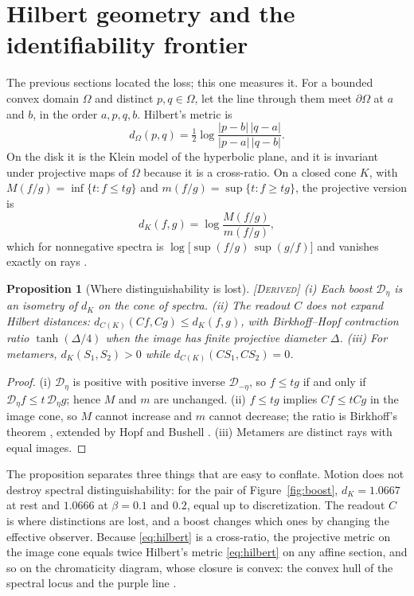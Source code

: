 \documentclass[11pt]{article}
\theoremstyle{boldplain}
\newtheorem{proposition}[lemma]{Proposition}
\theoremstyle{boldupright}
\newcommand{\derived}{[\textup{\textsc{Derived}}]}
\newcommand{\Dop}{\mathcal{D}}
\begin{document}
\section{Hilbert geometry and the identifiability frontier}\label{sec:hilbert}

The previous sections located the loss; this one measures it. For a bounded convex domain $\Omega$ and
distinct $p,q\in\Omega$, let the line through them meet $\partial\Omega$ at $a$ and $b$, in the order $a,p,q,b$. Hilbert's
metric is \cite{hilbert1895}
\begin{equation}\label{eq:hilbert}
d_\Omega(p,q)=\tfrac12\log\frac{|p-b|\,|q-a|}{|p-a|\,|q-b|}.
\end{equation}
On the disk it is the Klein model of the hyperbolic plane, and it is invariant under projective
maps of $\Omega$ because it is a cross-ratio. On a closed cone $K$, with $M(f/g)=\inf\{t:f\le tg\}$ and
$m(f/g)=\sup\{t:f\ge tg\}$, the projective version is
\begin{equation}\label{eq:projmetric}
d_K(f,g)=\log\frac{M(f/g)}{m(f/g)},
\end{equation}
which for nonnegative spectra is $\log\bigl[\sup(f/g)\,\sup(g/f)\bigr]$ and vanishes exactly on rays \cite{birkhoff1957,bushell1973}.

\begin{proposition}[Where distinguishability is lost]\label{prop:hilbert}
\derived{} (i) Each boost $\Dop_\eta$ is an isometry of
$d_K$ on the cone of spectra. (ii) The readout $C$ does not expand Hilbert distances: $d_{C(K)}(Cf,Cg)\le
d_K(f,g)$, with Birkhoff--Hopf contraction ratio $\tanh(\Delta/4)$ when the image has finite projective
diameter $\Delta$. (iii) For metamers, $d_K(S_1,S_2)>0$ while $d_{C(K)}(CS_1,CS_2)=0$.
\end{proposition}

\begin{proof}
(i) $\Dop_\eta$ is positive with positive inverse $\Dop_{-\eta}$, so $f\le tg$ if and only if $\Dop_\eta f\le t\,\Dop_\eta g$; hence $M$
and $m$ are unchanged. (ii) $f\le tg$ implies $Cf\le tCg$ in the image cone, so $M$ cannot increase and
$m$ cannot decrease; the ratio is Birkhoff's theorem \cite{birkhoff1957}, extended by Hopf \cite{hopf1963} and Bushell \cite{bushell1973}. (iii)
Metamers are distinct rays with equal images.
\end{proof}

The proposition separates three things that are easy to conflate. Motion does not destroy
spectral distinguishability: for the pair of Figure~\ref{fig:boost}, $d_K=1.0667$ at rest and $1.0666$ at $\beta=0.1$ and
$0.2$, equal up to discretization. The readout $C$ is where distinctions are lost, and a boost changes
which ones by changing the effective observer. Because \eqref{eq:hilbert} is a cross-ratio, the projective metric
on the image cone equals twice Hilbert's metric \eqref{eq:hilbert} on any affine section, and so on the chromaticity diagram,
whose closure is convex: the convex hull of the spectral locus and the purple line \cite{wyszecki1982}.
\end{document}
